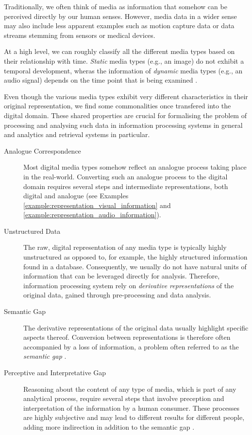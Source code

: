 Traditionally, we often think of media as information that somehow can be perceived directly by our human senses. However, media data in a wider sense may also include less apparent examples such as motion capture data or data streams stemming from sensors or medical devices. 

At a high level, we can roughly classify all the different media types based on their relationship with time. \emph{Static} media types (e.g., an image) do not exhibit a temporal development, wheras the information of \emph{dynamic} media types (e.g., an audio signal) depends on the time point that is being examined \cite{Blanken:2007multimedia}.

Even though the various media types exhibit very different characteristics in their original representation, we find some commonalities once transfered into the digital domain. These shared properties are crucial for formalising the problem of processing and analysing such data in information processing systems in general and analytics and retrieval systems in particular.

\begin{description}
    \item[Analogue Correspondence] Most digital media types somehow reflect an analogue process taking place in the real-world. Converting such an analogue process to the digital domain requires several steps and intermediate representations, both digital and analogue (see Examples \ref{example:representation_visual_information} and \ref{example:representation_audio_information}).

    \item[Unstructured Data] The raw, digital representation of any media type is typically highly unstructured as opposed to, for example, the highly structured information found in a database. Consequently, we usually do not have natural units of information that can be leveraged directly for analysis. Therefore, information processing system rely on \emph{derivative representations} of the original data, gained through pre-processing and data analysis.
    
    \item[Semantic Gap] The derivative representations of the original data usually highlight specific aspects thereof. Conversion between representations is therefore often accompanied by a loss of information, a problem often referred to as the \emph{semantic gap} \cite{Blanken:2007multimedia, Rossetto:2018thesis}.

    \item[Perceptive and Interpretative Gap] Reasoning about the content of any type of media, which is part of any analytical process, require several steps that involve preception and interpretation of the information by a human consumer. These processes are highly subjective and may lead to different results for different people, adding more indirection in addition to the semantic gap \cite{Rossetto:2018thesis}.
\end{description}

